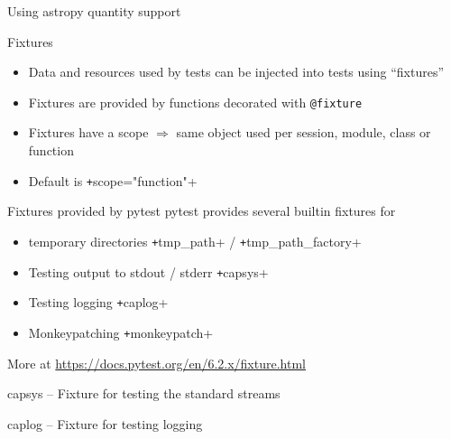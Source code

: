 \begin{frame}[c, fragile]{Using astropy quantity support}
\end{frame}

\begin{frame}[c]{Fixtures}
  \begin{itemize}
    \item Data and resources used by tests can be injected into tests using \enquote{fixtures}
    \item Fixtures are provided by functions decorated with \texttt{@fixture}
    \item Fixtures have a scope $⇒$ same object used per session, module, class or function
    \item Default is \texttt+scope="function"+
  \end{itemize}
\end{frame}

\begin{frame}[c]{Fixtures provided by pytest}
  pytest provides several builtin fixtures for
  \begin{itemize}
    \item temporary directories \texttt+tmp_path+ / \texttt+tmp_path_factory+
    \item Testing output to stdout / stderr \texttt+capsys+
    \item Testing logging \texttt+caplog+
    \item Monkeypatching \texttt+monkeypatch+
  \end{itemize}
  More at \url{https://docs.pytest.org/en/6.2.x/fixture.html}
\end{frame}

\begin{frame}[c]{capsys – Fixture for testing the standard streams}
\end{frame}

\begin{frame}[c]{caplog – Fixture for testing logging}
\end{frame}

